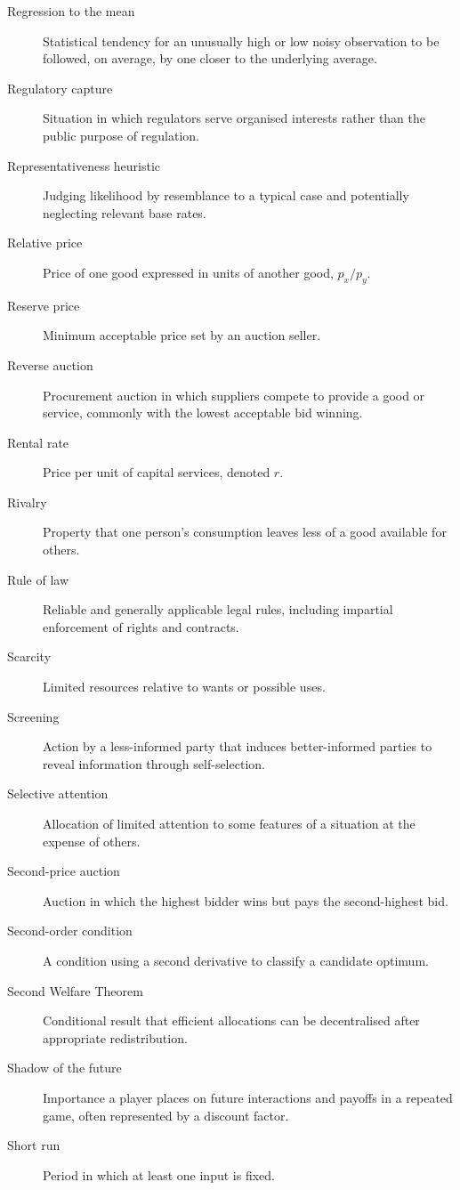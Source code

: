 \begin{description}
  \item[Regression to the mean] Statistical tendency for an unusually high or low noisy observation to be followed, on average, by one closer to the underlying average.
  \item[Regulatory capture] Situation in which regulators serve organised interests rather than the public purpose of regulation.
  \item[Representativeness heuristic] Judging likelihood by resemblance to a typical case and potentially neglecting relevant base rates.
  \item[Relative price] Price of one good expressed in units of another good, $p_x/p_y$.
  \item[Reserve price] Minimum acceptable price set by an auction seller.
  \item[Reverse auction] Procurement auction in which suppliers compete to provide a good or service, commonly with the lowest acceptable bid winning.
  \item[Rental rate] Price per unit of capital services, denoted $r$.
  \item[Rivalry] Property that one person's consumption leaves less of a good available for others.
  \item[Rule of law] Reliable and generally applicable legal rules, including impartial enforcement of rights and contracts.
  \item[Scarcity] Limited resources relative to wants or possible uses.
  \item[Screening] Action by a less-informed party that induces better-informed parties to reveal information through self-selection.
  \item[Selective attention] Allocation of limited attention to some features of a situation at the expense of others.
  \item[Second-price auction] Auction in which the highest bidder wins but pays the second-highest bid.
  \item[Second-order condition] A condition using a second derivative to classify a candidate optimum.
  \item[Second Welfare Theorem] Conditional result that efficient allocations can be decentralised after appropriate redistribution.
  \item[Shadow of the future] Importance a player places on future interactions and payoffs in a repeated game, often represented by a discount factor.
  \item[Short run] Period in which at least one input is fixed.

\end{description}
